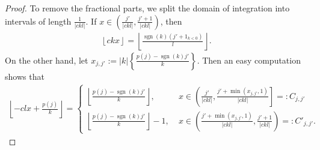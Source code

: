 \documentclass[11pt]{amsart}
\theoremstyle{definition}
\newcommand{\1}{{\mathbf{1}}}
\DeclareMathOperator{\sgn}{sgn}
\newcommand{\floor}[1]{{\left \lfloor #1 \right \rfloor}}
\newcommand{\rem}[1]{\left \{ #1 \right \}}
\begin{document}
\begin{proof}
To remove the fractional parts, we split the domain of integration into intervals of length $\frac{1}{|ckl|}$. 
If $x\in\left(\frac{j'}{|ckl|}, \frac{j'+1}{|ckl|}\right)$, then 
\begin{align*}
    \floor{ck x} = \floor{\frac{\sgn(k)(j' +1_{k<0})}{l}}. %
\end{align*}
On the other hand, let $x_{j,j'} := |k|\rem{\frac{p(j)-\sgn(k)j'}{k}}$.  Then an easy computation shows that
\begin{align*}
     \floor{-clx + \frac{p(j)}{k}} = \begin{cases}
         \floor{\frac{p(j)-\sgn(k)j'}{k}},\; &x\in \left(\frac{j'}{|ckl|}, \frac{j'+\min(x_{j,j'},1)}{|ckl|} \right]=:C_{j,j'}\\
         \floor{\frac{p(j)-\sgn(k)j'}{k}}-1,\; &x\in \left(\frac{j'+\min(x_{j,j'},1)}{|ckl|},\frac{j'+1}{|ckl|}\right) =: C'_{j,j'}.
     \end{cases}
\end{align*}


\end{proof}
\end{document}

